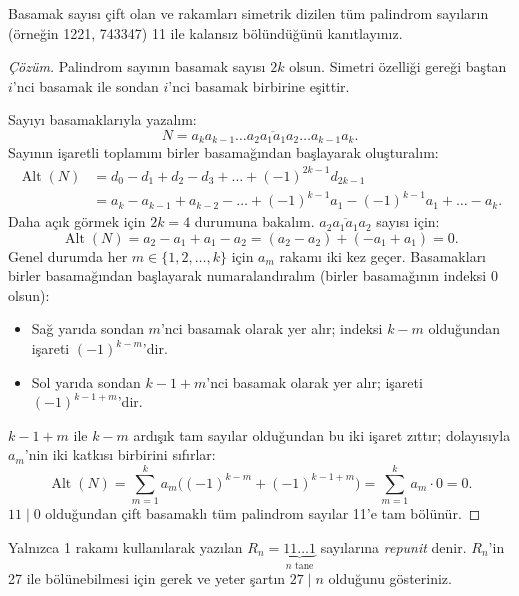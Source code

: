 \begin{example}
Basamak sayısı çift olan ve rakamları simetrik dizilen tüm palindrom sayıların (örneğin 1221, 743347) 11 ile kalansız bölündüğünü kanıtlayınız.
\end{example}

\begin{proof}[Çözüm]
Palindrom sayının basamak sayısı $2k$ olsun. Simetri özelliği gereği baştan $i$'nci basamak ile sondan $i$'nci basamak birbirine eşittir.

Sayıyı basamaklarıyla yazalım:
\[
N = \overline{a_k a_{k-1} \dots a_2 a_1 a_1 a_2 \dots a_{k-1} a_k}.
\]
Sayının işaretli toplamını birler basamağından başlayarak oluşturalım:
\begin{align*}
\operatorname{Alt}(N) &= d_0 - d_1 + d_2 - d_3 + \dots + (-1)^{2k-1} d_{2k-1} \\
&= a_k - a_{k-1} + a_{k-2} - \dots + (-1)^{k-1} a_1 - (-1)^{k-1} a_1 + \dots - a_k.
\end{align*}
Daha açık görmek için $2k = 4$ durumuna bakalım. $\overline{a_2 a_1 a_1 a_2}$ sayısı için:
\[
\operatorname{Alt}(N) = a_2 - a_1 + a_1 - a_2 = (a_2 - a_2) + (-a_1 + a_1) = 0.
\]
Genel durumda her $m \in \{1, 2, \dots, k\}$ için $a_m$ rakamı iki kez geçer. Basamakları birler basamağından başlayarak numaralandıralım (birler basamağının indeksi $0$ olsun):
\begin{itemize}
    \item Sağ yarıda sondan $m$'nci basamak olarak yer alır; indeksi $k-m$ olduğundan işareti $(-1)^{k-m}$'dir.
    \item Sol yarıda sondan $k-1+m$'nci basamak olarak yer alır; işareti $(-1)^{k-1+m}$'dir.
\end{itemize}
$k-1+m$ ile $k-m$ ardışık tam sayılar olduğundan bu iki işaret zıttır; dolayısıyla $a_m$'nin iki katkısı birbirini sıfırlar:
\[
\operatorname{Alt}(N) = \sum_{m=1}^k a_m \Big( (-1)^{k-m} + (-1)^{k-1+m} \Big) = \sum_{m=1}^k a_m \cdot 0 = 0.
\]
$11 \mid 0$ olduğundan çift basamaklı tüm palindrom sayılar 11'e tam bölünür.
\end{proof}

\begin{example}
Yalnızca 1 rakamı kullanılarak yazılan $R_n = \underbrace{11\dots1}_{n \text{ tane}}$ sayılarına \emph{repunit} denir. $R_n$'in 27 ile bölünebilmesi için gerek ve yeter şartın $27 \mid n$ olduğunu gösteriniz.
\end{example}


